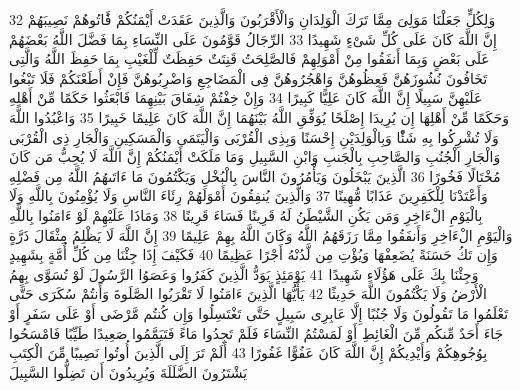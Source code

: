 {\tiny\colorbox{cl_aya}{32}} وَلِكُلٍّ جَعَلْنَا مَوَلِىَ مِمَّا تَرَكَ الْوَلِدَانِ وَالْأَقْرَبُونَ وَالَّذِينَ عَقَدَتْ أَيْمَنُكُمْ فََٔاتُوهُمْ نَصِيبَهُمْ إِنَّ اللَّهَ كَانَ عَلَى كُلِّ شَىْءٍ شَهِيدًا
{\tiny\colorbox{cl_aya}{33}} الرِّجَالُ قَوَّمُونَ عَلَى النِّسَاءِ بِمَا فَضَّلَ اللَّهُ بَعْضَهُمْ عَلَى بَعْضٍ وَبِمَا أَنفَقُوا مِنْ أَمْوَلِهِمْ فَالصَّلِحَتُ قَنِتَتٌ حَفِظَتٌ لِّلْغَيْبِ بِمَا حَفِظَ اللَّهُ وَالَّتِى تَخَافُونَ نُشُوزَهُنَّ فَعِظُوهُنَّ وَاهْجُرُوهُنَّ فِى الْمَضَاجِعِ وَاضْرِبُوهُنَّ فَإِنْ أَطَعْنَكُمْ فَلَا تَبْغُوا عَلَيْهِنَّ سَبِيلًا إِنَّ اللَّهَ كَانَ عَلِيًّا كَبِيرًا
{\tiny\colorbox{cl_aya}{34}} وَإِنْ خِفْتُمْ شِقَاقَ بَيْنِهِمَا فَابْعَثُوا حَكَمًا مِّنْ أَهْلِهِ وَحَكَمًا مِّنْ أَهْلِهَا إِن يُرِيدَا إِصْلَحًا يُوَفِّقِ اللَّهُ بَيْنَهُمَا إِنَّ اللَّهَ كَانَ عَلِيمًا خَبِيرًا
{\tiny\colorbox{cl_aya}{35}} وَاعْبُدُوا اللَّهَ وَلَا تُشْرِكُوا بِهِ شَئًْا وَبِالْوَلِدَيْنِ إِحْسَنًا وَبِذِى الْقُرْبَى وَالْيَتَمَى وَالْمَسَكِينِ وَالْجَارِ ذِى الْقُرْبَى وَالْجَارِ الْجُنُبِ وَالصَّاحِبِ بِالْجَنبِ وَابْنِ السَّبِيلِ وَمَا مَلَكَتْ أَيْمَنُكُمْ إِنَّ اللَّهَ لَا يُحِبُّ مَن كَانَ مُخْتَالًا فَخُورًا
{\tiny\colorbox{cl_aya}{36}} الَّذِينَ يَبْخَلُونَ وَيَأْمُرُونَ النَّاسَ بِالْبُخْلِ وَيَكْتُمُونَ مَا ءَاتَىهُمُ اللَّهُ مِن فَضْلِهِ وَأَعْتَدْنَا لِلْكَفِرِينَ عَذَابًا مُّهِينًا
{\tiny\colorbox{cl_aya}{37}} وَالَّذِينَ يُنفِقُونَ أَمْوَلَهُمْ رِئَاءَ النَّاسِ وَلَا يُؤْمِنُونَ بِاللَّهِ وَلَا بِالْيَوْمِ الْءَاخِرِ وَمَن يَكُنِ الشَّيْطَنُ لَهُ قَرِينًا فَسَاءَ قَرِينًا
{\tiny\colorbox{cl_aya}{38}} وَمَاذَا عَلَيْهِمْ لَوْ ءَامَنُوا بِاللَّهِ وَالْيَوْمِ الْءَاخِرِ وَأَنفَقُوا مِمَّا رَزَقَهُمُ اللَّهُ وَكَانَ اللَّهُ بِهِمْ عَلِيمًا
{\tiny\colorbox{cl_aya}{39}} إِنَّ اللَّهَ لَا يَظْلِمُ مِثْقَالَ ذَرَّةٍ وَإِن تَكُ حَسَنَةً يُضَعِفْهَا وَيُؤْتِ مِن لَّدُنْهُ أَجْرًا عَظِيمًا
{\tiny\colorbox{cl_aya}{40}} فَكَيْفَ إِذَا جِئْنَا مِن كُلِّ أُمَّةٍ بِشَهِيدٍ وَجِئْنَا بِكَ عَلَى هَؤُلَاءِ شَهِيدًا
{\tiny\colorbox{cl_aya}{41}} يَوْمَئِذٍ يَوَدُّ الَّذِينَ كَفَرُوا وَعَصَوُا الرَّسُولَ لَوْ تُسَوَّى بِهِمُ الْأَرْضُ وَلَا يَكْتُمُونَ اللَّهَ حَدِيثًا
{\tiny\colorbox{cl_aya}{42}} يَأَيُّهَا الَّذِينَ ءَامَنُوا لَا تَقْرَبُوا الصَّلَوةَ وَأَنتُمْ سُكَرَى حَتَّى تَعْلَمُوا مَا تَقُولُونَ وَلَا جُنُبًا إِلَّا عَابِرِى سَبِيلٍ حَتَّى تَغْتَسِلُوا وَإِن كُنتُم مَّرْضَى أَوْ عَلَى سَفَرٍ أَوْ جَاءَ أَحَدٌ مِّنكُم مِّنَ الْغَائِطِ أَوْ لَمَسْتُمُ النِّسَاءَ فَلَمْ تَجِدُوا مَاءً فَتَيَمَّمُوا صَعِيدًا طَيِّبًا فَامْسَحُوا بِوُجُوهِكُمْ وَأَيْدِيكُمْ إِنَّ اللَّهَ كَانَ عَفُوًّا غَفُورًا
{\tiny\colorbox{cl_aya}{43}} أَلَمْ تَرَ إِلَى الَّذِينَ أُوتُوا نَصِيبًا مِّنَ الْكِتَبِ يَشْتَرُونَ الضَّلَلَةَ وَيُرِيدُونَ أَن تَضِلُّوا السَّبِيلَ
